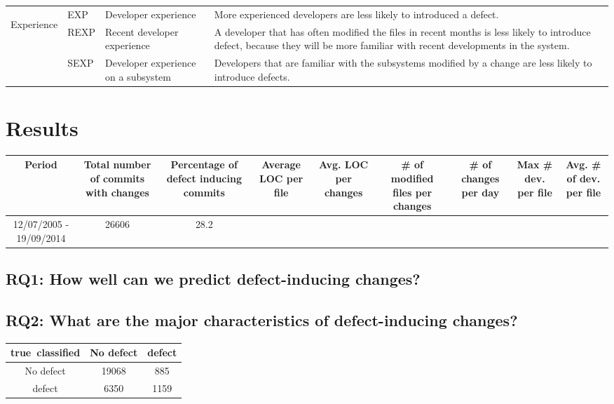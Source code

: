 \documentclass[10pt, conference]{IEEEtran}
\begin{document}
\begin{tabular}{|c|l|p{3cm}|p{6cm}|l|}
	\hline \multirow{3}{*}{\begin{sideways}Experience\end{sideways}} & EXP & Developer experience & More experienced developers are less likely to introduced a defect. &  \\ \cline{2-5} 
	& REXP & Recent developer experience & A developer that has often modified the files in recent months is less likely to introduce defect, because they will be more familiar with recent developments in the system. &  \\ \cline{2-5} 
	& SEXP & Developer experience on a subsystem & Developers that are familiar with the subsystems modified by a change are less likely to introduce defects. &  \\ 
	\hline 
\end{tabular} 

\twocolumn
\section{Results}
\label{sec:results}

\begin{tabular}{|c|c|c|c|c|c|c|c|c|}
	\hline 
	Period  & Total number of commits with changes  & Percentage of defect inducing commits  & Average LOC per file  & Avg. LOC per changes  & \# of modified files per changes  & \# of changes per day  & Max \# dev. per file  & Avg. \# of dev. per file \tabularnewline
	\hline 
	12/07/2005 - 19/09/2014  & 26606  & 28.2%
	&  &  &  &  &  & \tabularnewline
\end{tabular}


\subsection{RQ1: How well can we predict defect-inducing changes?}
\label{sec:rq1}


\subsection{RQ2: What are the major characteristics of defect-inducing changes?}
\label{sec:rq2}

\begin{tabular}{|c|c|c|}
	\hline 
	true\ classified  & No defect  & defect \tabularnewline
	\hline 
	No defect  & 19068  & 885 \tabularnewline
	\hline 
	defect  & 6350  & 1159 \tabularnewline
	\hline 
\end{tabular}
\end{document}

